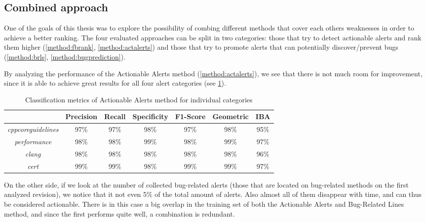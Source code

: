\subsection{Combined approach}
\label{results:ensemble_approach}
One of the goals of this thesis was to explore the possibility of combing different methods that cover each others weaknesses in order to achieve a better ranking. The four evaluated approaches can be split in two categories: those that try to detect actionable alerts and rank them higher (\cref{method:fbrank}, \cref{method:actalerts}) and those that try to promote alerts that can potentially discover/prevent bugs (\cref{method:brls}, \cref{method:bugprediction}).

By analyzing the performance of the Actionable Alerts method (\cref{method:actalerts}), we see that there is not much room for improvement, since it is able to achieve great results for all four alert categories (see \cref{results:individual_categories}).

\begin{table}[H]
	\centering
	\caption{Classification metrics of Actionable Alerts method for individual categories}
	\label{results:individual_categories}
	\begin{tabular}{@{}ccccccc@{}}
		\toprule
		& \textbf{Precision} & \textbf{Recall} & \textbf{Specificity} & \textbf{F1-Score} & \textbf{Geometric} & \textbf{IBA} \\ \midrule
		\textit{cppcoreguidelines} & 97\%               & 97\%            & 98\%                 & 97\%              & 98\%               & 95\%         \\
		\textit{performance}       & 98\%               & 98\%            & 99\%                 & 98\%              & 99\%               & 97\%         \\
		\textit{clang}             & 98\%               & 98\%            & 98\%                 & 98\%              & 98\%               & 96\%         \\
		\textit{cert}              & 99\%               & 99\%            & 98\%                 & 99\%              & 99\%               & 97\%         \\ \bottomrule
	\end{tabular}
\end{table}


On the other side, if we look at the number of collected bug-related alerts (those that are located on bug-related methods on the first analyzed revision), we notice that it not even 5\% of the total amount of alerts. 
Also almost all of them disappear with time, and can thus be considered actionable. There is in this case a big overlap in the training set of both the Actionable Alerts and Bug-Related Lines method, and since the first performs quite well, a combination is redundant. 

